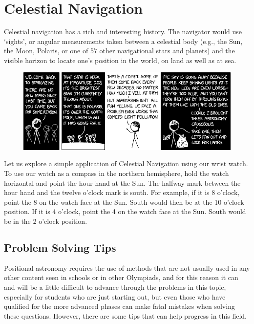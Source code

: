 \documentclass[a4paper,12pt]{extarticle}
\begin{document}
\clearpage
\section{Celestial Navigation}
Celestial navigation has a rich and interesting history. The navigator would use ‘sights’, or angular measurements taken between a celestial body (e.g., the Sun, the Moon, Polaris, or one of 57 other navigational stars and planets) and the visible horizon to locate one’s position in the world, on land
as well as at sea.

\begin{figure}[H]
	\centering
	\includegraphics[width=0.9\linewidth]{navigation.png}
\end{figure}

 Let us explore a simple application of Celestial Navigation using our wrist watch. To use our watch as a compass in the northern hemisphere, hold the watch horizontal and point the hour hand at the Sun. The halfway mark between the hour hand and the twelve o’clock mark is south. For example, if it is 8 o’clock, point the 8 on the watch face at the Sun. South would then be at the 10 o’clock position. If it is 4 o’clock, point the 4 on the watch face at the Sun. South would be in the 2 o’clock position.

\subsection{Problem Solving Tips}

Positional astronomy requires the use of methods that are not usually used in any other content seen in schools or in other Olympiads, and for this reason it can and will be a little difficult to advance through the problems in this topic, especially for students who are just starting out, but even those who have qualified for the more advanced phases can make fatal mistakes when solving these questions. However, there are some tips that can help progress in this field.
\end{document}
